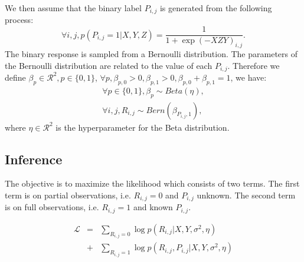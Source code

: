 \documentclass[journal]{IEEEtran}
\begin{document}
We then assume that the binary label $P_{i,j}$ is generated from the following process:
\begin{equation}\label{equ:p}
\forall i,j, p(P_{i,j}=1|X,Y,Z)=\frac{1}{1+\exp{(-XZY)}_{i,j}}.
\end{equation}
The binary response is sampled from a Bernoulli distribution. The parameters of the Bernoulli distribution are related to the value of each $P_{i,j}$. Therefore we define $\beta_p\in\mathcal{R}^{2},p\in \{0,1\}$, $\forall p, \beta_{p,0}>0,\beta_{p,1}>0,\beta_{p,0}+\beta_{p,1}=1$, we have:
\begin{eqnarray}\label{equ:q}
\forall p\in \{0,1\}, \beta_p \sim Beta(\eta),\\
\forall i,j, R_{i,j} \sim Bern (\beta_{P_{i,j},1}),
\end{eqnarray}
where $\eta\in\mathcal{R}^{2}$ is the hyperparameter for the Beta distribution.

\subsection{Inference}\label{sec:inference}
The objective is to maximize the likelihood which consists of two terms. The first term is on partial observations, i.e. $R_{i,j}=0$ and $P_{i,j}$ unknown. The second term is on full observations, i.e. $R_{i,j}=1$ and known $P_{i,j}$.

\begin{eqnarray}\label{equ:loss}
\mathcal{L}&=&\sum_{R_{i,j}=0} \log p(R_{i,j}|X,Y,\sigma^2,\eta) \nonumber\\
&+& \sum_{R_{i,j}=1} \log p(R_{i,j},P_{i,j}|X,Y,\sigma^2,\eta)
\end{eqnarray}
\end{document}
